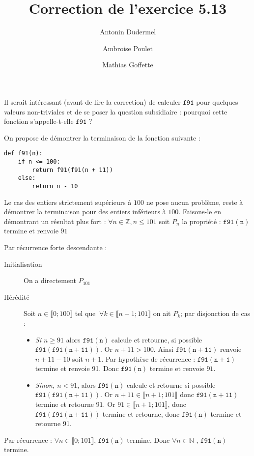 \documentclass[11pt,a4paper]{article}
\title{Correction de l'exercice 5.13}
\date{}
\author{Antonin Dudermel \and Ambroise Poulet \and Mathias Goffette}
\begin{document}

\maketitle

\begin{it}
Il serait intéressant (avant de lire la correction) de calculer \;$\mathtt{f91}$ pour quelques valeurs non-triviales et de se poser la question subsidiaire : pourquoi cette fonction s'appelle-t-elle \;$\mathtt{f91}$ ?
\end{it}
\par
On propose de démontrer la terminaison de la fonction suivante :

\begin{lstlisting}
def f91(n):
    if n <= 100:
        return f91(f91(n + 11))
    else:
        return n - 10
\end{lstlisting}

\par
Le cas des entiers strictement supérieurs à $100$ ne pose aucun problème, reste à démontrer la terminaison pour des entiers inférieurs à $100$.
Faisons-le en démontrant un résultat plus fort : $\forall n \in \mathbb{Z}, n\leq 101$ soit $P_n$ la propriété : \og{} $\mathtt{f91(n)}$ termine et renvoie $91$ \fg{}
\par
Par récurrence forte descendante :\\
\begin{description}
\item[Initialisation] \quad On a directement $P_{101}$
\item[Hérédité] \quad Soit $n\in \llbracket 0;100\rrbracket$ tel que $ ~ \forall k \in \llbracket n+1;101\rrbracket$ on ait $P_{k}$; par disjonction de cas : 
\begin{itemize}[\textbullet]
	\item {\itshape Si $n\geqslant 91$ } alors $\mathtt{f91(n)}$ calcule et retourne, si possible $\mathtt{f91(f91(n+11))}$. Or $n+11 > 100$. Ainsi $\mathtt{f91(n+11)}$ renvoie $n+11-10$ soit $n+1$. Par hypothèse de récurrence : $\mathtt{f91(n+1)}$ termine et renvoie 91. Donc $\mathtt{f91(n)}$ termine et renvoie $91$.
	\item {\itshape Sinon, $n < 91$}, alors $\mathtt{f91(n)}$ calcule et retourne si possible $\mathtt{f91(f91(n+11))}$. Or $n+11\in \llbracket n+1;101 \rrbracket$ donc $\mathtt{f91(n+11)}$ termine et retourne $91$. Or $91 \in \llbracket n+1;101 \rrbracket$, donc $\mathtt{f91(f91(n+11))}$ termine et retourne, donc $\mathtt{f91(n)}$ termine et retourne 91.
\end{itemize}
\end{description}
Par récurrence : $\forall n \in \llbracket 0;101 \rrbracket$, $\mathtt{f91(n)}$ termine.
Donc $\forall n \in \mathbb{N}$ , $\mathtt{f91(n)}$ termine.
\end{document}
